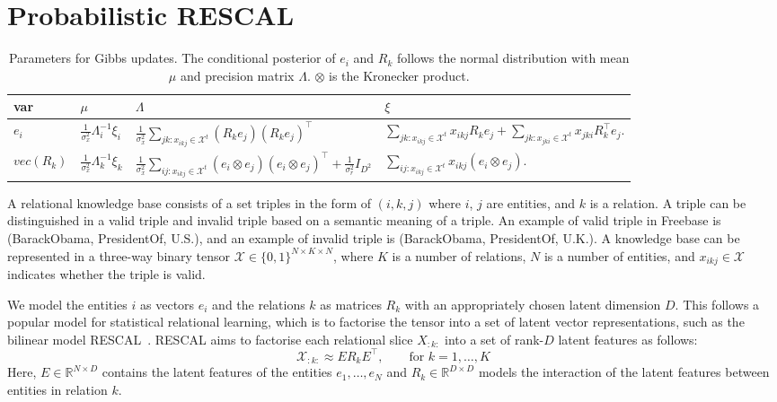 \section{Probabilistic RESCAL}
\label{sec:brescal}

\begin{table*}[bt]
\caption{Parameters for Gibbs updates. The conditional posterior of $e_i$ and $R_k$ follows the normal distribution with mean $\mu$ and precision matrix $\Lambda$. $\otimes$ is the Kronecker product.}
\label{tab:brescalposterior}
\vskip 0.05in
\begin{tabu}{l|l|l|l}
var&$\mu$&$\Lambda$&$\xi$\\
\hline
$e_i$&
$\frac{1}{\sigma_x^2}\Lambda_i^{-1}\xi_i$&
$\frac{1}{\sigma_x^2} \sum_{jk : x_{ikj} \in \mathcal{X}^{t}} (R_k e_j)(R_k e_j)^\top$&
$\sum_{jk : x_{ikj} \in \mathcal{X}^{t}}  x_{ikj} R_{k} e_{j} +
\sum_{jk : x_{jki} \in \mathcal{X}^{t}} x_{jki} R_{k}^\top e_{j}.$
\\
$vec(R_k)$&
$\frac{1}{\sigma_x^2}\Lambda_k^{-1}\xi_k$&
$\frac{1}{\sigma_x^2} \sum_{ij:x_{ikj} \in \mathcal{X}^{t}} (e_i
\otimes e_j)(e_i \otimes e_j)^\top + \frac{1}{\sigma_r^2} {I}_{D^2}$&
$\sum_{ij:x_{ikj} \in \mathcal{X}^{t}} x_{ikj} (e_{i} \otimes e_{j}).$
\end{tabu}
\end{table*}


A relational knowledge base consists of a set triples in the form of $(i, k, j)$
where $i$, $j$ are entities, and $k$ is a relation. A triple can be distinguished
in a valid triple and invalid triple based on a semantic meaning of a triple. An
example of valid triple in Freebase is (BarackObama, PresidentOf, U.S.), and an
example of invalid triple is (BarackObama, PresidentOf, U.K.).
A knowledge base can be represented in a three-way binary tensor
$\mathcal{X} \in \{0, 1\}^{N \times K \times N}$, where $K$ is a number of
relations, $N$ is a number of entities, and $x_{ikj}\in\mathcal{X}$ indicates whether
the triple is valid.

We model the entities $i$ as vectors $e_i$ and the relations $k$ as matrices $R_k$ with an
appropriately chosen latent dimension $D$. This follows a popular model
for statistical relational learning, which is to factorise the tensor into a
set of latent vector representations, such as the bilinear model RESCAL~\cite{nickel2011three}.
RESCAL aims to factorise each relational slice $X_{:k:}$ into a set of rank-$D$ latent
features as follows:
\[
  \mathcal{X}_{:k:} \approx E R_k E^\top, \qquad \text{for } k = 1, \dots, K
\]
Here, $E\in {\mathbb R}^{N \times D}$ contains the latent features of the
entities $e_1, \ldots, e_N$ and $R_k\in {\mathbb R}^{D \times D}$ models the interaction of the
latent features between entities in relation $k$.

